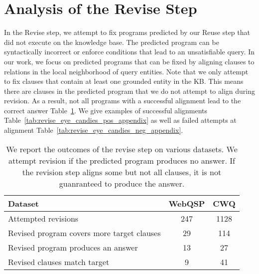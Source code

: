 \documentclass{article}
\begin{document}
\section{Analysis of the Revise Step}

In the Revise step, we attempt to fix programs predicted by our Reuse step that did not execute on the knowledge base. The predicted program can be syntactically incorrect or enforce conditions that lead to an unsatisfiable query. In our work, we focus on predicted programs that can be fixed by aligning clauses to relations in the local neighborhood of query entities. Note that we only attempt to fix clauses that contain at least one grounded entity in the KB. This means there are clauses in the predicted program that we do not attempt to align during revision. As a result, not all programs with a successful alignment lead to the correct answer Table~\ref{tab:revision_stats}. We give examples of successful alignments Table~\ref{tab:revise_eye_candies_pos_appendix} as well as failed attempts at alignment Table~\ref{tab:revise_eye_candies_neg_appendix}.

\begin{table}[]
    \centering
    \begin{tabular}{l c c} \toprule
         Dataset & WebQSP & CWQ \\\hline
         Attempted revisions & 247 & 1128 \\
         Revised program covers more target clauses & 29 & 114 \\
         Revised program produces an answer & 13 & 27 \\
         Revised clauses match target & 9 & 41 \\\bottomrule
    \end{tabular}
    \caption{We report the outcomes of the revise step on various datasets. We attempt revision if the predicted program produces no answer. If the revision step aligns some but not all clauses, it is not guanranteed to produce the answer.}
    \label{tab:revision_stats}
\end{table}
\end{document}
